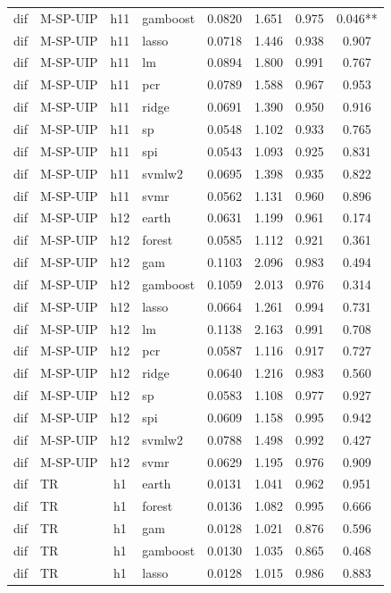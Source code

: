 \begin{ThreePartTable}
\begin{longtable}[t]{llclcccc}
dif & M-SP-UIP & h11 & gamboost & 0.0820 & 1.651 & 0.975 & 0.046**\\
dif & M-SP-UIP & h11 & lasso & 0.0718 & 1.446 & 0.938 & 0.907\\
dif & M-SP-UIP & h11 & lm & 0.0894 & 1.800 & 0.991 & 0.767\\
dif & M-SP-UIP & h11 & pcr & 0.0789 & 1.588 & 0.967 & 0.953\\
dif & M-SP-UIP & h11 & ridge & 0.0691 & 1.390 & 0.950 & 0.916\\
dif & M-SP-UIP & h11 & sp & 0.0548 & 1.102 & 0.933 & 0.765\\
dif & M-SP-UIP & h11 & spi & 0.0543 & 1.093 & 0.925 & 0.831\\
dif & M-SP-UIP & h11 & svmlw2 & 0.0695 & 1.398 & 0.935 & 0.822\\
dif & M-SP-UIP & h11 & svmr & 0.0562 & 1.131 & 0.960 & 0.896\\
\addlinespace
dif & M-SP-UIP & h12 & earth & 0.0631 & 1.199 & 0.961 & 0.174\\
dif & M-SP-UIP & h12 & forest & 0.0585 & 1.112 & 0.921 & 0.361\\
dif & M-SP-UIP & h12 & gam & 0.1103 & 2.096 & 0.983 & 0.494\\
dif & M-SP-UIP & h12 & gamboost & 0.1059 & 2.013 & 0.976 & 0.314\\
dif & M-SP-UIP & h12 & lasso & 0.0664 & 1.261 & 0.994 & 0.731\\
dif & M-SP-UIP & h12 & lm & 0.1138 & 2.163 & 0.991 & 0.708\\
dif & M-SP-UIP & h12 & pcr & 0.0587 & 1.116 & 0.917 & 0.727\\
dif & M-SP-UIP & h12 & ridge & 0.0640 & 1.216 & 0.983 & 0.560\\
dif & M-SP-UIP & h12 & sp & 0.0583 & 1.108 & 0.977 & 0.927\\
dif & M-SP-UIP & h12 & spi & 0.0609 & 1.158 & 0.995 & 0.942\\
dif & M-SP-UIP & h12 & svmlw2 & 0.0788 & 1.498 & 0.992 & 0.427\\
dif & M-SP-UIP & h12 & svmr & 0.0629 & 1.195 & 0.976 & 0.909\\
\addlinespace
dif & TR & h1 & earth & 0.0131 & 1.041 & 0.962 & 0.951\\
dif & TR & h1 & forest & 0.0136 & 1.082 & 0.995 & 0.666\\
dif & TR & h1 & gam & 0.0128 & 1.021 & 0.876 & 0.596\\
dif & TR & h1 & gamboost & 0.0130 & 1.035 & 0.865 & 0.468\\
dif & TR & h1 & lasso & 0.0128 & 1.015 & 0.986 & 0.883\\

\end{longtable}
\end{ThreePartTable}
